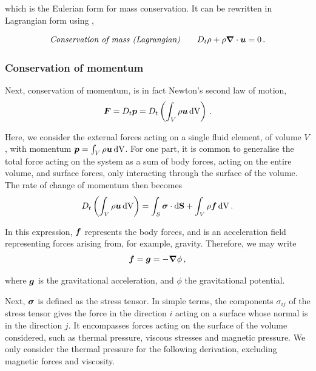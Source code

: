 which is the Eulerian form for mass conservation. It can be rewritten in Lagrangian form using ,
\begin{boxedeq}
    \begin{equation}
        \textit{Conservation of mass (Lagrangian)} \qquad D_t \rho + \rho \nablavec \cdot \fvec{u} = 0 \punct{.} \label{eq:mass_lag}
    \end{equation}
\end{boxedeq}

\subsubsection{Conservation of momentum} \label{sec:fluid_eq_mom}

Next, conservation of momentum, is in fact Newton's second law of motion,
\begin{equation}
    \fvec{F} = D_t \fvec{p} = D_t \left( \int_V \rho \fvec{u} \,\upd[V] \right) \punct{.} \label{eq:newton2}
\end{equation}

Here, we consider the external forces acting on a single fluid element, of volume \(V\), with momentum \(\fvec{p} = \int_V \rho \fvec{u} \,\upd[V]\). For one part, it is common to generalise the total force acting on the system as a sum of body forces, acting on the entire volume, and surface forces, only interacting through the surface of the volume. The rate of change of momentum then becomes
\begin{equation}
    D_t \left( \int_V \rho \fvec{u} \,\upd[V] \right) = \int_S \fvec{\sigma} \cdot \updvec{S} + \int_V \rho \fvec{f} \,\upd[V] \punct{.}
\end{equation}

In this expression, \(\fvec{f}\) represents the body forces, and is an acceleration field representing forces arising from, for example, gravity. Therefore, we may write
\begin{equation}
    \fvec{f} = \fvec{g} = - \nablavec \phi \punct{,}
\end{equation}

where \(\fvec{g}\) is the gravitational acceleration, and \(\phi\) the gravitational potential.

Next, \(\fvec{\sigma}\) is defined as the stress tensor. In simple terms, the components \(\sigma_{ij}\) of the stress tensor gives the force in the direction \(i\) acting on a surface whose normal is in the direction \(j\). It encompasses forces acting on the surface of the volume considered, such as thermal pressure, viscous stresses and magnetic pressure. We only consider the thermal pressure for the following derivation, excluding magnetic forces and viscosity.

